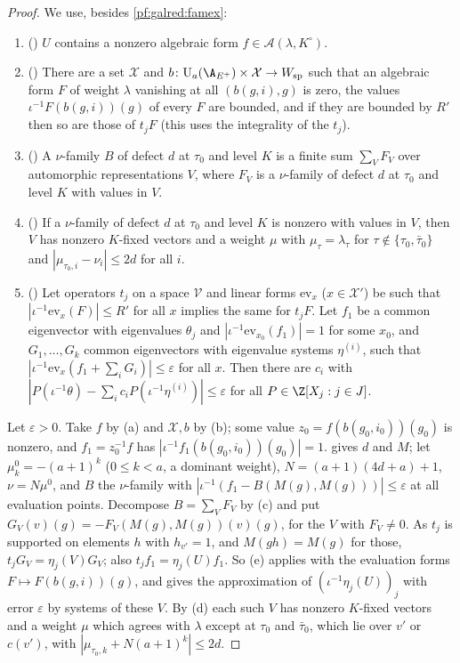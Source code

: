 \begin{proof}
We use, besides \cref{pf:galred:famex}:
\begin{enumerate}[label=(\alph*),nosep]
\item () $U$ contains a nonzero algebraic form
  $f\in\mathcal A(\lambda,K^\circ)$.
\item () There are a set $\mathcal X$ and $b\colon\galredU_a(\A_{E^+})\times
  \mathcal X\to W_{\mathrm{sp}}$ such that an algebraic form $F$ of weight $\lambda$ vanishing at all $(b(g,i),g)$ is zero,
  the values $\iota^{-1}F(b(g,i))(g)$ of every $F$ are bounded, and if they are bounded by $R'$ then so are those of
  $t_jF$ (this uses the integrality of the $t_j$).
\item () A $\nu$-family $B$ of defect $d$ at $\tau_0$ and level $K$ is a finite sum
  $\sum_VF_V$ over automorphic representations $V$, where $F_V$ is a $\nu$-family of defect $d$ at $\tau_0$ and level $K$ with
  values in $V$.
\item () If a $\nu$-family of defect $d$ at $\tau_0$ and level $K$ is nonzero with
  values in $V$, then $V$ has nonzero $K$-fixed vectors and a weight $\mu$ with $\mu_\tau=\lambda_\tau$ for
  $\tau\notin\{\tau_0,\bar\tau_0\}$ and $|\mu_{\tau_0,i}-\nu_i|\le2d$ for all $i$.
\item () Let operators $t_j$ on a space $\mathcal V$
  and linear forms $\mathrm{ev}_x$ ($x\in\mathcal X'$) be such that $|\iota^{-1}\mathrm{ev}_x(F)|\le R'$ for all $x$ implies the
  same for $t_jF$. Let $f_1$ be a common eigenvector with eigenvalues $\theta_j$ and $|\iota^{-1}\mathrm{ev}_{x_0}(f_1)|=1$ for
  some $x_0$, and $G_1,\dots,G_k$ common eigenvectors with eigenvalue systems $\eta^{(i)}$, such that
  $|\iota^{-1}\mathrm{ev}_x(f_1+\sum_iG_i)|\le\varepsilon$ for all $x$. Then there are $c_i$ with
  $|P(\iota^{-1}\theta)-\sum_ic_iP(\iota^{-1}\eta^{(i)})|\le\varepsilon$ for all $P\in\Z[X_j:j\in J]$.
\end{enumerate}
Let $\varepsilon>0$. Take $f$ by (a) and $\mathcal X,b$ by (b); some value $z_0=f(b(g_0,i_0))(g_0)$ is nonzero, and
$f_1=z_0^{-1}f$ has $|\iota^{-1}f_1(b(g_0,i_0))(g_0)|=1$.  gives $d$ and $M$; let $\mu^0_k=-(a+1)^k$
($0\le k<a$, a dominant weight), $N=(a+1)(4d+a)+1$, $\nu=N\mu^0$, and $B$ the $\nu$-family with
$|\iota^{-1}(f_1-B(M(g),M(g)))|\le\varepsilon$ at all evaluation points. Decompose $B=\sum_VF_V$ by (c) and put
$G_V(v)(g)=-F_V(M(g),M(g))(v)(g)$, for the $V$ with $F_V\ne0$. As $t_j$ is supported on elements $h$ with $h_{v'}=1$, and
$M(gh)=M(g)$ for those, $t_jG_V=\eta_j(V)G_V$; also $t_jf_1=\eta_j(U)f_1$. So (e) applies with the evaluation forms
$F\mapsto F(b(g,i))(g)$, and gives the approximation of $(\iota^{-1}\eta_j(U))_j$ with error $\varepsilon$ by systems of
these $V$. By (d) each such $V$ has nonzero $K$-fixed vectors and a weight $\mu$ which agrees with $\lambda$ except at
$\tau_0$ and $\bar\tau_0$, which lie over $v'$ or $c(v')$, with $|\mu_{\tau_0,k}+N(a+1)^k|\le2d$.


\end{proof}
